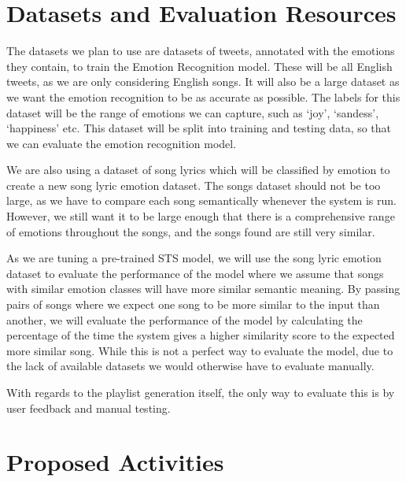 \documentclass[11pt]{article}
\begin{document}
\section{Datasets and Evaluation Resources}
The datasets we plan to use are datasets of tweets\cite{gupta_2021}\cite{pandey_2022}, annotated with the emotions they contain, to train the Emotion Recognition model. These will be all English tweets, as we are only considering English songs. It will also be a large dataset as we want the emotion recognition to be as accurate as possible. The labels for this dataset will be the range of emotions we can capture, such as `joy', `sandess', `happiness' etc. This dataset will be split into training and testing data, so that we can evaluate the emotion recognition model.

We are also using a dataset of song lyrics\cite{shah_2021} which will be classified by emotion to create a new song lyric emotion dataset. The songs dataset should not be too large, as we have to compare each song semantically whenever the system is run. However, we still want it to be large enough that there is a comprehensive range of emotions throughout the songs, and the songs found are still very similar.

As we are tuning a pre-trained STS model, we will use the song lyric emotion dataset to evaluate the performance of the model where we assume that songs with similar emotion classes will have more similar semantic meaning. By passing pairs of songs where we expect one song to be more similar to the input than another, we will evaluate the performance of the model by calculating the percentage of the time the system gives a higher similarity score to the expected more similar song. While this is not a perfect way to evaluate the model, due to the lack of available datasets we would otherwise have to evaluate manually.

With regards to the playlist generation itself, the only way to evaluate this is by user feedback and manual testing.


\section{Proposed Activities}
\end{document}
